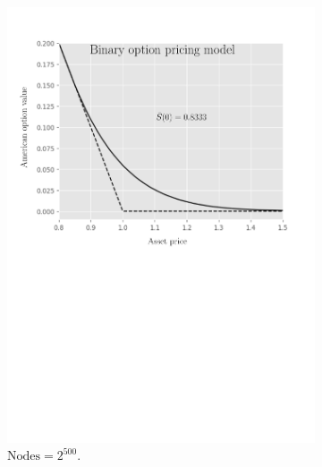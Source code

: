 \begin{figure}[H]
  \centering
  \begin{subfigure}{0.4\textwidth}
    \centering
    \includegraphics[width=\textwidth]{chapters/chapter5/TestCase4LcpBOPM.pdf}
    \caption{$\text{Nodes} = 2^{500}$.}
    \label{fig:lcp:numericaresults:test_case_4_bopm}
  \end{subfigure}
  \hspace{0.5cm}
  \begin{subfigure}{0.4\textwidth}
    \centering

\end{subfigure}
\end{figure}
